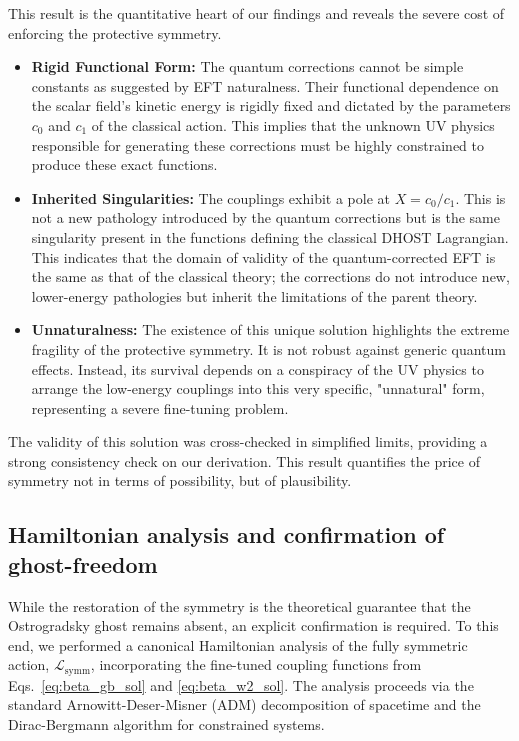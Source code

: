 \documentclass[twocolumn]{aastex631}
\begin{document}
This result is the quantitative heart of our findings and reveals the severe cost of enforcing the protective symmetry.
\begin{itemize}
    \item \textbf{Rigid Functional Form:} The quantum corrections cannot be simple constants as suggested by EFT naturalness. Their functional dependence on the scalar field's kinetic energy is rigidly fixed and dictated by the parameters $c_0$ and $c_1$ of the classical action. This implies that the unknown UV physics responsible for generating these corrections must be highly constrained to produce these exact functions.
    
    \item \textbf{Inherited Singularities:} The couplings exhibit a pole at $X = c_0/c_1$. This is not a new pathology introduced by the quantum corrections but is the same singularity present in the functions defining the classical DHOST Lagrangian. This indicates that the domain of validity of the quantum-corrected EFT is the same as that of the classical theory; the corrections do not introduce new, lower-energy pathologies but inherit the limitations of the parent theory.
    
    \item \textbf{Unnaturalness:} The existence of this unique solution highlights the extreme fragility of the protective symmetry. It is not robust against generic quantum effects. Instead, its survival depends on a conspiracy of the UV physics to arrange the low-energy couplings into this very specific, "unnatural" form, representing a severe fine-tuning problem.
\end{itemize}
The validity of this solution was cross-checked in simplified limits, providing a strong consistency check on our derivation. This result quantifies the price of symmetry not in terms of possibility, but of plausibility.

\subsection{Hamiltonian analysis and confirmation of ghost-freedom}
While the restoration of the symmetry is the theoretical guarantee that the Ostrogradsky ghost remains absent, an explicit confirmation is required. To this end, we performed a canonical Hamiltonian analysis of the fully symmetric action, $\mathcal{L}_{\text{symm}}$, incorporating the fine-tuned coupling functions from Eqs.~\eqref{eq:beta_gb_sol} and \eqref{eq:beta_w2_sol}. The analysis proceeds via the standard Arnowitt-Deser-Misner (ADM) decomposition of spacetime and the Dirac-Bergmann algorithm for constrained systems.
\end{document}
